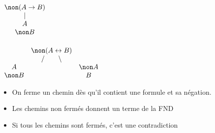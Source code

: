 \hspace{2cm}
$\begin{array}{c} \non (A \rightarrow B) \\ | \\ A \\ \non B \end{array}$
\hspace{2cm} \\ \\ \vspace{1cm}
$\begin{array}{ccc} & \non (A \leftrightarrow B) & \\ & / \hspace{0.7cm} \backslash & \\ A & & \non A \\ \non B & & B \end{array}$\\

\begin{itemize}
  \item On ferme un chemin dès qu'il contient une formule et sa négation. 
  \item Les chemins non fermés donnent un terme de la FND
  \item Si tous les chemins sont fermés, c'est une contradiction
\end{itemize}

